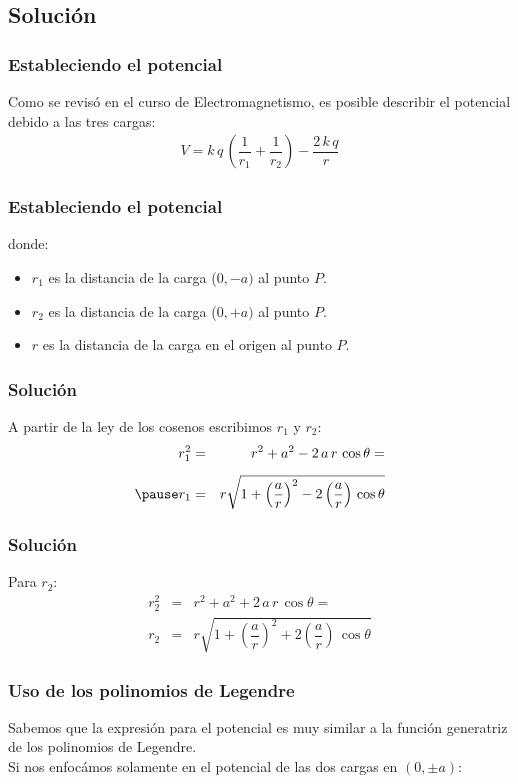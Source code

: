 \subsection{Solución}
\begin{frame}
\frametitle{Estableciendo el potencial}
Como se revisó en el curso de Electromagnetismo, es posible describir el potencial debido a las tres cargas:
\pause
\begin{align}
V = k \, q \, \left( \dfrac{1}{r_{1}} + \dfrac{1}{r_{2}} \right) - \dfrac{2 \, k \, q}{r}
\label{eq:ecuacion_01}
\end{align}
\end{frame}
\begin{frame}
\frametitle{Estableciendo el potencial}
\begin{figure}
    \centering
    
\end{figure}
\pause
\fontsize{12}{12}\selectfont
donde:
\begin{itemize}
\item $r_{1}$ es la distancia de la carga ($0, -a)$ al punto $P$.
\item $r_{2}$ es la distancia de la carga ($0, +a)$ al punto $P$.
\item $r$ es la distancia de la carga en el origen al punto $P$.
\end{itemize}
\end{frame}
\begin{frame}
\frametitle{Solución}
A partir de la ley de los cosenos escribimos $r_{1}$ y $r_{2}$:
\pause
\begin{eqnarray*}
r_{1}^{2} &=& r^{2} + a^{2} - 2 \, a \, r \, \cos \theta =  \\[0.5em] \pause 
r_{1} &=& r \sqrt{1 + \left( \dfrac{a}{r} \right)^{2} - 2 \left( \dfrac{a}{r} \right) \, \cos \theta}
\end{eqnarray*}
\end{frame}
\begin{frame}
\frametitle{Solución}
Para $r_{2}$:
\pause
\begin{eqnarray*}
r_{2}^{2} &=& r^{2} + a^{2} + 2 \, a \, r \, \cos \theta =  \\[0.5em]
r_{2} &=& r \sqrt{1 + \left( \dfrac{a}{r} \right)^{2} + 2 \left( \dfrac{a}{r} \right) \, \cos \theta}
\end{eqnarray*}
\end{frame}
\begin{frame}
\frametitle{Uso de los polinomios de Legendre}
Sabemos que la expresión para el potencial es muy similar a la función generatriz de los polinomios de Legendre.
\\
\bigskip
\pause
Si nos enfocámos solamente en el potencial de las dos cargas en $(0,\pm a)$:
\end{frame}
